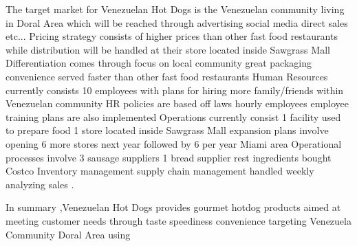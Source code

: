   The target market for Venezuelan Hot Dogs is the Venezuelan community living in Doral Area which will be reached through advertising social media direct sales etc... Pricing strategy consists of higher prices than other fast food restaurants while distribution will be handled at their store located inside Sawgrass Mall Differentiation comes through focus on local community great packaging convenience served faster than other fast food restaurants Human Resources currently consists 10 employees with plans for hiring more family/friends within Venezuelan community HR policies are based off laws hourly employees employee training plans are also implemented Operations currently consist 1 facility used to prepare food 1 store located inside Sawgrass Mall expansion plans involve opening 6 more stores next year followed by 6 per year Miami area Operational processes involve 3 sausage suppliers 1 bread supplier rest ingredients bought Costco Inventory management supply chain management handled weekly analyzing sales . 

 In summary ,Venezuelan Hot Dogs provides gourmet hotdog products aimed at meeting customer needs through taste speediness convenience targeting Venezuela Community Doral Area using